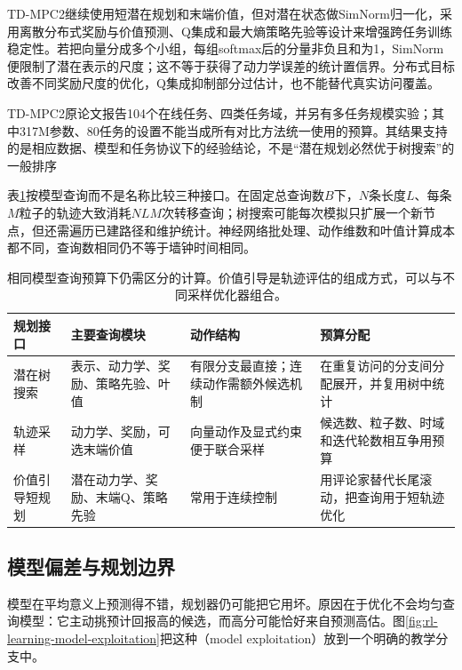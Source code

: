 TD-MPC2继续使用短潜在规划和末端价值，但对潜在状态做SimNorm归一化，采用离散分布式奖励与价值预测、Q集成和最大熵策略先验等设计来增强跨任务训练稳定性。若把向量分成多个小组，每组softmax后的分量非负且和为1，SimNorm便限制了潜在表示的尺度；这不等于获得了动力学误差的统计置信界。分布式目标改善不同奖励尺度的优化，Q集成抑制部分过估计，也不能替代真实访问覆盖。

TD-MPC2原论文报告104个在线任务、四类任务域，并另有多任务规模实验；其中317M参数、80任务的设置不能当成所有对比方法统一使用的预算。其结果支持的是相应数据、模型和任务协议下的经验结论，不是“潜在规划必然优于树搜索”的一般排序

表\ref{tab:rl-learning-planning-budgets}按模型查询而不是名称比较三种接口。在固定总查询数$B$下，$N$条长度$L$、每条$M$粒子的轨迹大致消耗$NLM$次转移查询；树搜索可能每次模拟只扩展一个新节点，但还需遍历已建路径和维护统计。神经网络批处理、动作维数和叶值计算成本都不同，查询数相同仍不等于墙钟时间相同。

\begin{table}[t]
  \centering
  \small
  \begin{tabularx}{\linewidth}{>{\raggedright\arraybackslash}p{23mm} >{\raggedright\arraybackslash}X >{\raggedright\arraybackslash}X >{\raggedright\arraybackslash}X}
    \toprule
    规划接口 & 主要查询模块 & 动作结构 & 预算分配 \\
    \midrule
    潜在树搜索 & 表示、动力学、奖励、策略先验、叶值 & 有限分支最直接；连续动作需额外候选机制 & 在重复访问的分支间分配展开，并复用树中统计 \\
    轨迹采样 & 动力学、奖励，可选末端价值 & 向量动作及显式约束便于联合采样 & 候选数、粒子数、时域和迭代轮数相互争用预算 \\
    价值引导短规划 & 潜在动力学、奖励、末端Q、策略先验 & 常用于连续控制 & 用评论家替代长尾滚动，把查询用于短轨迹优化 \\
    \bottomrule
  \end{tabularx}
  \caption{相同模型查询预算下仍需区分的计算。价值引导是轨迹评估的组成方式，可以与不同采样优化器组合。}
  \label{tab:rl-learning-planning-budgets}
\end{table}

\subsection{模型偏差与规划边界}
\label{sec:rl-learning-model-bias}

模型在平均意义上预测得不错，规划器仍可能把它用坏。原因在于优化不会均匀查询模型：它主动挑预计回报高的候选，而高分可能恰好来自预测高估。图\ref{fig:rl-learning-model-exploitation}把这种（model exploitation）放到一个明确的教学分支中。

